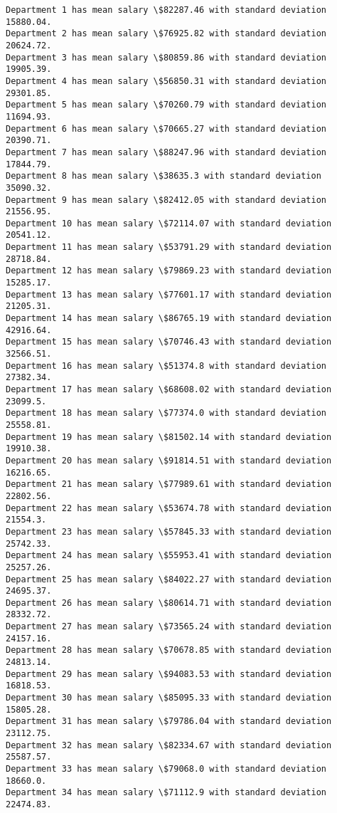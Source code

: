 \documentclass[11pt]{article}
\begin{document}
    \begin{Verbatim}[commandchars=\\\{\}]
Department 1 has mean salary \$82287.46 with standard deviation 15880.04.
Department 2 has mean salary \$76925.82 with standard deviation 20624.72.
Department 3 has mean salary \$80859.86 with standard deviation 19905.39.
Department 4 has mean salary \$56850.31 with standard deviation 29301.85.
Department 5 has mean salary \$70260.79 with standard deviation 11694.93.
Department 6 has mean salary \$70665.27 with standard deviation 20390.71.
Department 7 has mean salary \$88247.96 with standard deviation 17844.79.
Department 8 has mean salary \$38635.3 with standard deviation 35090.32.
Department 9 has mean salary \$82412.05 with standard deviation 21556.95.
Department 10 has mean salary \$72114.07 with standard deviation 20541.12.
Department 11 has mean salary \$53791.29 with standard deviation 28718.84.
Department 12 has mean salary \$79869.23 with standard deviation 15285.17.
Department 13 has mean salary \$77601.17 with standard deviation 21205.31.
Department 14 has mean salary \$86765.19 with standard deviation 42916.64.
Department 15 has mean salary \$70746.43 with standard deviation 32566.51.
Department 16 has mean salary \$51374.8 with standard deviation 27382.34.
Department 17 has mean salary \$68608.02 with standard deviation 23099.5.
Department 18 has mean salary \$77374.0 with standard deviation 25558.81.
Department 19 has mean salary \$81502.14 with standard deviation 19910.38.
Department 20 has mean salary \$91814.51 with standard deviation 16216.65.
Department 21 has mean salary \$77989.61 with standard deviation 22802.56.
Department 22 has mean salary \$53674.78 with standard deviation 21554.3.
Department 23 has mean salary \$57845.33 with standard deviation 25742.33.
Department 24 has mean salary \$55953.41 with standard deviation 25257.26.
Department 25 has mean salary \$84022.27 with standard deviation 24695.37.
Department 26 has mean salary \$80614.71 with standard deviation 28332.72.
Department 27 has mean salary \$73565.24 with standard deviation 24157.16.
Department 28 has mean salary \$70678.85 with standard deviation 24813.14.
Department 29 has mean salary \$94083.53 with standard deviation 16818.53.
Department 30 has mean salary \$85095.33 with standard deviation 15805.28.
Department 31 has mean salary \$79786.04 with standard deviation 23112.75.
Department 32 has mean salary \$82334.67 with standard deviation 25587.57.
Department 33 has mean salary \$79068.0 with standard deviation 18660.0.
Department 34 has mean salary \$71112.9 with standard deviation 22474.83.

    \end{Verbatim}
\end{document}

